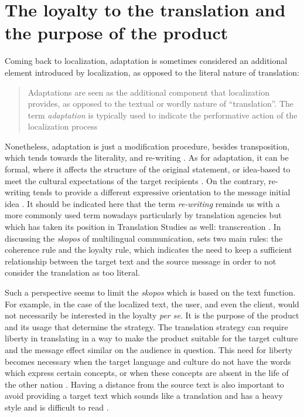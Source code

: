 \documentclass[output=paper]{langsci/langscibook}
\begin{document}
\section{The loyalty to the translation and the purpose of the product}

Coming back to localization, adaptation is sometimes considered an additional element introduced by localization, as opposed to the literal nature of translation: \blockcquote[15]{jimenez13}{Adaptations are seen as the additional component that localization provides, as opposed to the textual or wordly nature of \enquote{translation}. The term \textit{adaptation} is typically used to indicate the performative action of the localization process}.

Nonetheless, adaptation is just a modification procedure, besides transposition, which tends towards the literality, and re-writing \parencite{guidere00}. As for adaptation, it can be formal, where it affects the structure of the original statement, or idea-based to meet the cultural expectations of the target recipients \parencite[124]{guidere00}. On the contrary, re-writing tends to provide a different expressive orientation to the message initial idea \parencite[129]{guidere00}. It should be indicated here that the term \textit{re-writing} reminds us with a more commonly used term nowadays particularly by translation agencies but which has taken its position in Translation Studies as well: transcreation \parencites[cf.][]{pedersen14}{katan16}. In discussing the \textit{skopos} of multilingual communication, \textcite[17]{guidere08} sets two main rules: the coherence rule and the loyalty rule, which indicates the need to keep a sufficient relationship between the target text and the source message in order to not consider the translation as too literal. 

Such a perspective seems to limit the \textit{skopos} which is based on the text function. For example, in the case of the localized text, the user, and even the client, would not necessarily be interested in the loyalty \textit{per se}. It is the purpose of the product and its usage that determine the strategy. The translation strategy can require liberty in translating in a way to make the product suitable for the target culture and the message effect similar on the audience in question. This need for liberty becomes necessary when the target language and culture do not have the words which express certain concepts, or when these concepts are absent in the life of the other nation \parencite[54]{ranzato16}. Having a distance from the source text is also important to avoid providing a target text which sounds like a translation and has a heavy style and is difficult to read \parencite{boivineau72}.
\end{document}
